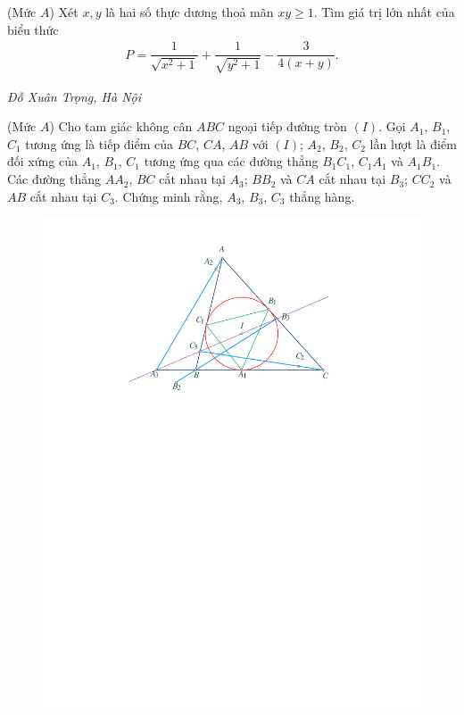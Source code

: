 \begin{multicols}{2}
	{}
	(Mức $A$) Xét $x,y$ là hai số thực dương thoả mãn $xy\ge 1$. Tìm giá trị lớn nhất của biểu thức
	\begin{align*}
		P=\dfrac1{\sqrt{x^2+1}}+\dfrac1{\sqrt{y^2+1}}-\dfrac3{4(x+y)}.
	\end{align*}
	\begin{flushright}
		\textit{Đỗ Xuân Trọng, Hà Nội}
	\end{flushright}
	{}
	(Mức $A$) Cho tam giác không cân $ABC$ ngoại tiếp đường tròn $(I)$. Gọi $A_1$, $B_1$, $C_1$ tương ứng là tiếp điểm của $BC$, $CA$, $AB$ với $(I)$; $A_2$, $B_2$, $C_2$ lần lượt là điểm đối xứng của $A_1$, $B_1$, $C_1$ tương ứng qua các đường thẳng $B_1C_1$, $C_1A_1$ và $A_1B_1$. Các đường thẳng $AA_2$, $BC$ cắt nhau tại $A_3$; $BB_2$ và $CA$ cắt nhau tại $B_3$; $CC_2$ và $AB$ cắt nhau tại $C_3$. Chứng minh rằng, $A_3$, $B_3$, $C_3$ thẳng hàng.
	\begin{figure}[H]
		\vspace*{-5pt}
		\centering
		\captionsetup{labelformat= empty, justification=centering}
		\includegraphics[width= 1.05\linewidth]{P628}

\end{figure}
\end{multicols}
